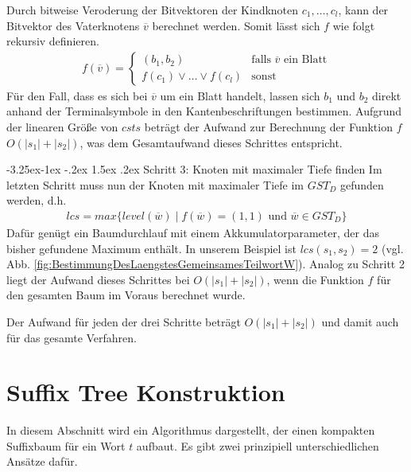 \documentclass[12pt]{report}
\makeatletter
\renewcommand\paragraph{\@startsection{paragraph}{4}{\z@}%
    {-3.25ex\@plus -1ex \@minus -.2ex}%
    {1.5ex \@plus .2ex}%
    {\normalfont\normalsize\bfseries}}
\newcommand{\abs}[1]{\left|#1\right|}
\makeatother
\begin{document}
Durch bitweise Veroderung der Bitvektoren der Kindknoten $c_1, \dots, c_l$, kann der Bitvektor des Vaterknotens $\overline{v}$ berechnet werden. Somit lässt sich $f$ wie folgt rekursiv definieren.
\begin{gather*}
    f(\overline{v}) = \begin{cases}
        (b_1, b_2)                    &\text{falls } \overline{v} \text{ ein Blatt} \\
        f(c_1) \vee \dots \vee f(c_l) &\text{sonst}
    \end{cases}
\end{gather*}
Für den Fall, dass es sich bei $\overline{v}$ um ein Blatt handelt, lassen sich $b_1$ und $b_2$ direkt anhand der Terminalsymbole in den Kantenbeschriftungen bestimmen. Aufgrund der linearen Größe von $csts$ beträgt der Aufwand zur Berechnung der Funktion $f$ $O(\abs{s_1} + \abs{s_2})$, was dem Gesamtaufwand dieses Schrittes entspricht.

\paragraph{Schritt 3: Knoten mit maximaler Tiefe finden}
Im letzten Schritt muss nun der Knoten mit maximaler Tiefe im $GST_D$ gefunden werden, d.h.
\begin{gather*}
   lcs = max \{level(\overline{w}) \mid f(\overline{w}) = (1, 1) \text{ und } \overline{w} \in GST_D\}
\end{gather*}
Dafür genügt ein Baumdurchlauf mit einem Akkumulatorparameter, der das bisher gefundene Maximum enthält. In unserem Beispiel ist $lcs(s_1, s_2) = 2$ (vgl. Abb. \ref{fig:BestimmungDesLaengstesGemeinsamesTeilwortW}). Analog zu Schritt 2 liegt der Aufwand dieses Schrittes bei $O(\abs{s_1} + \abs{s_2})$, wenn die Funktion $f$ für den gesamten Baum im Voraus berechnet wurde.

Der Aufwand für jeden der drei Schritte beträgt $O(\abs{s_1} + \abs{s_2})$ und damit auch für das gesamte Verfahren.

\section{Suffix Tree Konstruktion}
\label{sec:SuffixTreeKonstruktion}

In diesem Abschnitt wird ein Algorithmus dargestellt, der einen kompakten Suffixbaum für ein Wort $t$ aufbaut. Es gibt zwei prinzipiell unterschiedlichen Ansätze dafür.
\end{document}
